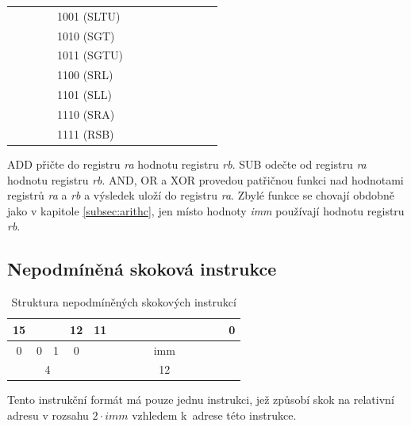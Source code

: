 \documentclass[
  digital, %
  color,   %
  table,   %
  twoside, %
  nolof,   %
  nolot,   %
]{fithesis3}
\begin{document}
\begin{table}[H]
\begin{tabular}{lllllcccllllllll}
 &  &  &  & \multicolumn{4}{l}{1001 (SLTU)} & \multicolumn{1}{c}{} & \multicolumn{1}{c}{} & \multicolumn{1}{c}{} & \multicolumn{1}{c}{} & \multicolumn{1}{c}{} &  &  &  \\
 &  &  &  & \multicolumn{4}{l}{1010 (SGT)} & \multicolumn{1}{c}{} & \multicolumn{1}{c}{} & \multicolumn{1}{c}{} & \multicolumn{1}{c}{} & \multicolumn{1}{c}{} &  &  &  \\
 &  &  &  & \multicolumn{4}{l}{1011 (SGTU)} &  &  &  &  &  &  &  &  \\
 &  &  &  & \multicolumn{4}{l}{1100 (SRL)} &  &  &  &  &  &  &  &  \\
 &  &  &  & \multicolumn{4}{l}{1101 (SLL)} &  &  &  &  &  &  &  &  \\
 &  &  &  & \multicolumn{4}{l}{1110 (SRA)} &  &  &  &  &  &  &  &  \\
 &  &  &  & \multicolumn{4}{l}{1111 (RSB)} &  &  &  &  &  &  &  & 
\end{tabular}
\end{table}

ADD přičte do registru \textit{ra} hodnotu registru \textit{rb}. SUB odečte od registru \textit{ra} hodnotu registru \textit{rb}. AND, OR a XOR provedou patřičnou funkci nad hodnotami registrů \textit{ra} a \textit{rb} a výsledek uloží do registru \textit{ra}. Zbylé funkce se chovají obdobně jako v kapitole \ref{subsec:arithc}, jen místo hodnoty \textit{imm} používají hodnotu registru \textit{rb}. \newpage

\subsection{Nepodmíněná skoková instrukce}
\begin{table}[H]
\caption{Struktura nepodmíněných skokových instrukcí}
\begin{tabular}{cccccccccccccccc}
15 &  &  & 12 & 11 &  &  &  &  &  &  &  &  &  &  & 0 \\ \hline
\multicolumn{1}{|c}{0} & 0 & 1 & \multicolumn{1}{c|}{0} & \multicolumn{12}{c|}{imm} \\ \hline
\multicolumn{4}{c}{{\color[HTML]{656565} 4}} & \multicolumn{12}{c}{{\color[HTML]{656565} 12}}
\end{tabular}
\end{table}

Tento instrukční formát má pouze jednu instrukci, jež způsobí skok na relativní adresu v rozsahu $2 \cdot imm$ vzhledem k~adrese této instrukce.
\end{document}
